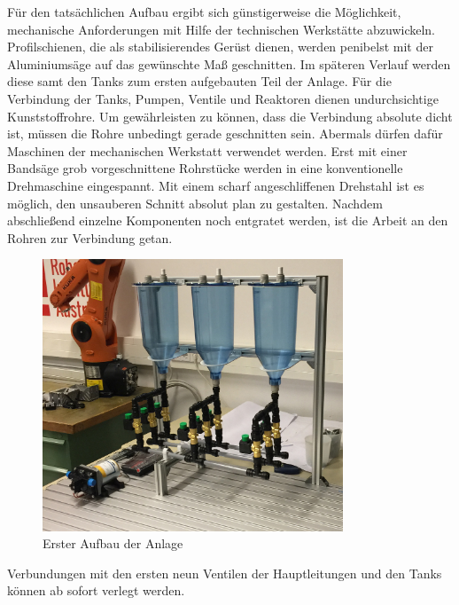 	Für den tatsächlichen Aufbau ergibt sich günstigerweise die Möglichkeit, mechanische Anforderungen mit Hilfe der technischen Werkstätte abzuwickeln. Profilschienen, die als stabilisierendes Gerüst dienen, werden penibelst mit der Aluminiumsäge auf das gewünschte Maß geschnitten. Im späteren Verlauf werden diese samt den Tanks zum ersten aufgebauten Teil der Anlage. Für die Verbindung der Tanks, Pumpen, Ventile und Reaktoren dienen undurchsichtige Kunststoffrohre. Um gewährleisten zu können, dass die Verbindung absolute dicht ist, müssen die Rohre unbedingt gerade geschnitten sein. Abermals dürfen dafür Maschinen der mechanischen Werkstatt verwendet werden. Erst mit einer Bandsäge grob vorgeschnittene Rohrstücke werden in eine konventionelle Drehmaschine eingespannt. Mit einem scharf angeschliffenen Drehstahl ist es möglich, den unsauberen Schnitt absolut plan zu gestalten. Nachdem abschließend einzelne Komponenten noch entgratet werden, ist die Arbeit an den Rohren zur Verbindung getan.\\
	
	\begin{figure}[h!]
	  \centering
	  \includegraphics[width=0.8\textwidth]{graphics/implementation/ErsterAufbau.jpg}
	  \caption{Erster Aufbau der Anlage}
	  \label{fig:erster_aufbau}
	\end{figure}	
	
	Verbundungen mit den ersten neun Ventilen der Hauptleitungen und den Tanks können ab sofort verlegt werden.\\
		

